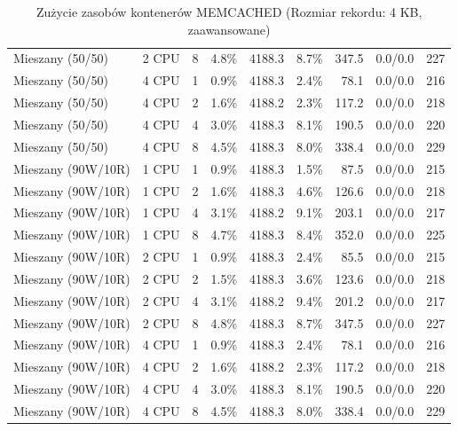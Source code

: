 \begin{table}[ht]
{\begin{tabular}{llcrrrrcc}
Mieszany (50/50) & 2 CPU & 8 & 4.8\% & 4188.3 & 8.7\% & 347.5 & 0.0/0.0 & 227 \\
Mieszany (50/50) & 4 CPU & 1 & 0.9\% & 4188.3 & 2.4\% & 78.1 & 0.0/0.0 & 216 \\
Mieszany (50/50) & 4 CPU & 2 & 1.6\% & 4188.2 & 2.3\% & 117.2 & 0.0/0.0 & 218 \\
Mieszany (50/50) & 4 CPU & 4 & 3.0\% & 4188.3 & 8.1\% & 190.5 & 0.0/0.0 & 220 \\
Mieszany (50/50) & 4 CPU & 8 & 4.5\% & 4188.3 & 8.0\% & 338.4 & 0.0/0.0 & 229 \\
Mieszany (90W/10R) & 1 CPU & 1 & 0.9\% & 4188.3 & 1.5\% & 87.5 & 0.0/0.0 & 215 \\
Mieszany (90W/10R) & 1 CPU & 2 & 1.6\% & 4188.3 & 4.6\% & 126.6 & 0.0/0.0 & 218 \\
Mieszany (90W/10R) & 1 CPU & 4 & 3.1\% & 4188.2 & 9.1\% & 203.1 & 0.0/0.0 & 217 \\
Mieszany (90W/10R) & 1 CPU & 8 & 4.7\% & 4188.3 & 8.4\% & 352.0 & 0.0/0.0 & 225 \\
Mieszany (90W/10R) & 2 CPU & 1 & 0.9\% & 4188.3 & 2.4\% & 85.5 & 0.0/0.0 & 215 \\
Mieszany (90W/10R) & 2 CPU & 2 & 1.5\% & 4188.3 & 3.6\% & 123.6 & 0.0/0.0 & 218 \\
Mieszany (90W/10R) & 2 CPU & 4 & 3.1\% & 4188.2 & 9.4\% & 201.2 & 0.0/0.0 & 217 \\
Mieszany (90W/10R) & 2 CPU & 8 & 4.8\% & 4188.3 & 8.7\% & 347.5 & 0.0/0.0 & 227 \\
Mieszany (90W/10R) & 4 CPU & 1 & 0.9\% & 4188.3 & 2.4\% & 78.1 & 0.0/0.0 & 216 \\
Mieszany (90W/10R) & 4 CPU & 2 & 1.6\% & 4188.2 & 2.3\% & 117.2 & 0.0/0.0 & 218 \\
Mieszany (90W/10R) & 4 CPU & 4 & 3.0\% & 4188.3 & 8.1\% & 190.5 & 0.0/0.0 & 220 \\
Mieszany (90W/10R) & 4 CPU & 8 & 4.5\% & 4188.3 & 8.0\% & 338.4 & 0.0/0.0 & 229 \\
\bottomrule
\end{tabular}%
}
\caption{Zużycie zasobów kontenerów MEMCACHED (Rozmiar rekordu: 4 KB, zaawansowane)}
\label{tab:resources_memcached_medium_0}
\end{table}
